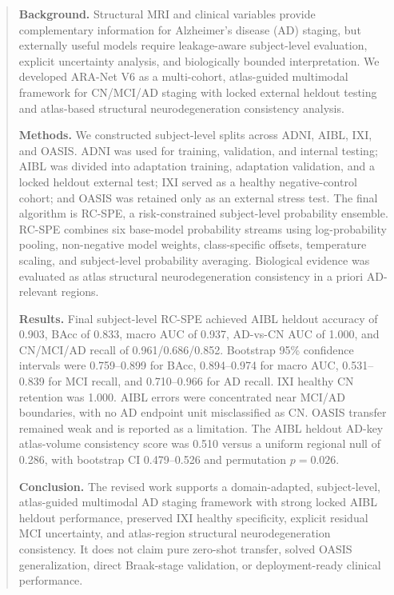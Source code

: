 \begin{abstract}

\textbf{Background.}
Structural MRI and clinical variables provide complementary information for Alzheimer's disease (AD) staging, but externally useful models require leakage-aware subject-level evaluation, explicit uncertainty analysis, and biologically bounded interpretation. We developed ARA-Net V6 as a multi-cohort, atlas-guided multimodal framework for CN/MCI/AD staging with locked external heldout testing and atlas-based structural neurodegeneration consistency analysis.

\textbf{Methods.}
We constructed subject-level splits across ADNI, AIBL, IXI, and OASIS. ADNI was used for training, validation, and internal testing; AIBL was divided into adaptation training, adaptation validation, and a locked heldout external test; IXI served as a healthy negative-control cohort; and OASIS was retained only as an external stress test. The final algorithm is RC-SPE, a risk-constrained subject-level probability ensemble. RC-SPE combines six base-model probability streams using log-probability pooling, non-negative model weights, class-specific offsets, temperature scaling, and subject-level probability averaging. Biological evidence was evaluated as atlas structural neurodegeneration consistency in a priori AD-relevant regions.

\textbf{Results.}
Final subject-level RC-SPE achieved AIBL heldout accuracy of 0.903, BAcc of 0.833, macro AUC of 0.937, AD-vs-CN AUC of 1.000, and CN/MCI/AD recall of 0.961/0.686/0.852. Bootstrap 95\% confidence intervals were 0.759--0.899 for BAcc, 0.894--0.974 for macro AUC, 0.531--0.839 for MCI recall, and 0.710--0.966 for AD recall. IXI healthy CN retention was 1.000. AIBL errors were concentrated near MCI/AD boundaries, with no AD endpoint unit misclassified as CN. OASIS transfer remained weak and is reported as a limitation. The AIBL heldout AD-key atlas-volume consistency score was 0.510 versus a uniform regional null of 0.286, with bootstrap CI 0.479--0.526 and permutation $p=0.026$.

\textbf{Conclusion.}
The revised work supports a domain-adapted, subject-level, atlas-guided multimodal AD staging framework with strong locked AIBL heldout performance, preserved IXI healthy specificity, explicit residual MCI uncertainty, and atlas-region structural neurodegeneration consistency. It does not claim pure zero-shot transfer, solved OASIS generalization, direct Braak-stage validation, or deployment-ready clinical performance.

\end{abstract}

